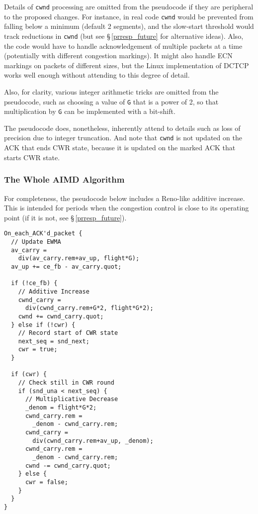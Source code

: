 Details of \texttt{cwnd} processing are omitted from the pseudocode if they are
peripheral to the proposed changes. For instance, in real code \texttt{cwnd}
would be prevented from falling below a minimum (default 2 segments), and the
slow-start threshold would track reductions in \texttt{cwnd} (but see
\S\,\ref{prresp_future} for alternative ideas). Also, the code would have to
handle acknowledgement of multiple packets at a time (potentially with different
congestion markings). It might also handle ECN markings on packets of different
sizes, but the Linux implementation of DCTCP works well enough without attending
to this degree of detail.

Also, for clarity, various integer arithmetic tricks are omitted from the
pseudocode, such as choosing a value of \texttt{G} that is a power of 2, so that
multiplication by \texttt{G} can be implemented with a bit-shift.

The pseudocode does, nonetheless, inherently attend to details such as loss of
precision due to integer truncation. And note that \texttt{cwnd} is not updated
on the ACK that ends CWR state, because it is updated on the marked ACK that
starts CWR state.

\subsubsection{The Whole AIMD Algorithm}\label{prresp_AIMD}

For completeness, the pseudocode below %
includes a Reno-like additive increase.
This is intended for periods when the congestion control is close to its
operating point (if it is not, see \S\,\ref{prresp_future}).

\begin{verbatim}
On_each_ACK'd_packet {
  // Update EWMA
  av_carry = 
    div(av_carry.rem+av_up, flight*G);
  av_up += ce_fb - av_carry.quot;

  if (!ce_fb) {
    // Additive Increase
    cwnd_carry = 
      div(cwnd_carry.rem+G*2, flight*G*2);
    cwnd += cwnd_carry.quot;
  } else if (!cwr) {
    // Record start of CWR state
    next_seq = snd_next;
    cwr = true;
  }

  if (cwr) {
    // Check still in CWR round
    if (snd_una < next_seq) {
      // Multiplicative Decrease
      _denom = flight*G*2;
      cwnd_carry.rem = 
        _denom - cwnd_carry.rem;
      cwnd_carry = 
        div(cwnd_carry.rem+av_up, _denom);
      cwnd_carry.rem = 
        _denom - cwnd_carry.rem;
      cwnd -= cwnd_carry.quot;
    } else {
      cwr = false;
    }
  }
}
\end{verbatim}

